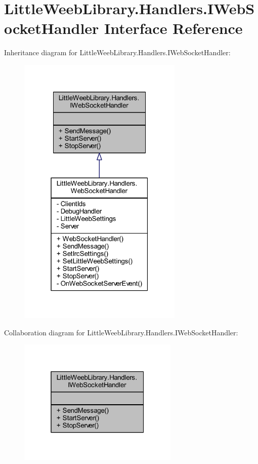 \hypertarget{interface_little_weeb_library_1_1_handlers_1_1_i_web_socket_handler}{}\section{Little\+Weeb\+Library.\+Handlers.\+I\+Web\+Socket\+Handler Interface Reference}
\label{interface_little_weeb_library_1_1_handlers_1_1_i_web_socket_handler}


Inheritance diagram for Little\+Weeb\+Library.\+Handlers.\+I\+Web\+Socket\+Handler\+:\nopagebreak
\begin{figure}[H]
\begin{center}
\leavevmode
\includegraphics[width=223pt]{interface_little_weeb_library_1_1_handlers_1_1_i_web_socket_handler__inherit__graph}
\end{center}
\end{figure}


Collaboration diagram for Little\+Weeb\+Library.\+Handlers.\+I\+Web\+Socket\+Handler\+:\nopagebreak
\begin{figure}[H]
\begin{center}
\leavevmode
\includegraphics[width=217pt]{interface_little_weeb_library_1_1_handlers_1_1_i_web_socket_handler__coll__graph}
\end{center}
\end{figure}
